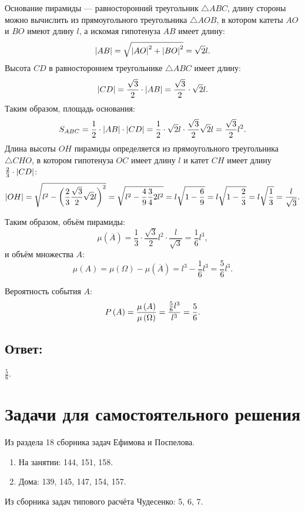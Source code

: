 Основание пирамиды --- равносторонний треугольник $\triangle ABC$, длину стороны можно вычислить из прямоугольного треугольника $\triangle AOB$,
в котором катеты $AO$ и $BO$ имеют длину $l$, а искомая гипотенуза $AB$ имеет длину:
\begin{equation}
    \left | AB \right | = \sqrt{ \left | AO \right |^2 + \left | BO \right |^2 } = \sqrt{2} l.
\end{equation}
Высота $CD$ в равностороннем треугольнике $\triangle ABC$ имеет длину:
\begin{equation}
    \left | CD \right |
    = \frac{\sqrt{3}}{2} \cdot \left | AB \right |
    = \frac{\sqrt{3}}{2} \cdot \sqrt{2} l .
\end{equation}
Таким образом, площадь основания:
\begin{equation}
    S_{ABC}
    = \frac{1}{2} \cdot \left | AB \right | \cdot \left | CD \right |
    = \frac{1}{2} \cdot \sqrt{2} l \cdot \frac{\sqrt{3}}{2} \sqrt{2} l
    = \frac{\sqrt{3}}{2} l^2 .
\end{equation}
Длина высоты $OH$ пирамиды определяется из прямоугольного треугольника $\triangle CHO$, в котором гипотенуза $OC$ имеет длину $l$ и катет $CH$
имеет длину $\frac{2}{3} \cdot \left | CD \right |$:
\begin{equation}
    \left | OH \right |
    = \sqrt{l^2 - \left ( \frac{2}{3} \frac{\sqrt{3}}{2} \sqrt{2} l  \right )^2}
    = \sqrt{l^2 - \frac{4}{9} \frac{3}{4} 2 l^2}
    = l \sqrt{1 - \frac{6}{9}}
    = l \sqrt{1 - \frac{2}{3}}
    = l \sqrt{\frac{1}{3}}
    = \frac{l}{\sqrt{3}} .
\end{equation}

Таким образом, объём пирамиды:
\begin{equation}
    \mu \left( \overline{A} \right)
    = \frac{1}{3} \cdot \frac{\sqrt{3}}{2} l^2 \cdot \frac{l}{\sqrt{3}}
    = \frac{1}{6} l^3 ,
\end{equation}
и объём множества $A$:
\begin{equation}
    \mu \left ( A \right )
    = \mu \left ( \Omega \right ) - \mu \left ( \overline{A} \right )
    = l^3 - \frac{1}{6} l^3
    = \frac{5}{6} l^3 .
\end{equation}

Вероятность события $A$:
\begin{equation}
    P \left ( A \right )
    = \frac{\mu \left ( A \right )}{\mu \left ( \Omega \right )}
    = \frac{\frac{5}{6} l^3}{l^3}
    = \frac{5}{6} .
\end{equation}

\subsection*{Ответ:}
$\frac{5}{6}$.

\section*{Задачи для самостоятельного решения}

Из раздела 18 сборника задач Ефимова и Поспелова.
\begin{enumerate}
    \item На занятии: 144, 151, 158.
    \item Дома: 139, 145, 147, 154, 157.
\end{enumerate}

Из сборника задач типового расчёта Чудесенко: 5, 6, 7.